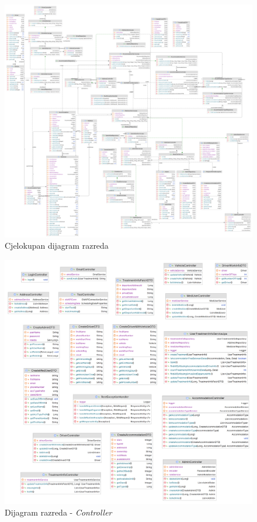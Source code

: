 			\begin{figure}[H]
				\includegraphics[width=\textwidth]{slike/CjelokupanDijagramRazreda.PNG}
				\caption{Cjelokupan dijagram razreda}
				\label{classDiagram}
			\end{figure}
			
			\begin{figure}[H]
				\includegraphics[width=\textwidth]{slike/rest.PNG}
				\caption{Dijagram razreda - \textit{Controller}}
				\label{restDiagram}
			\end{figure}
			
